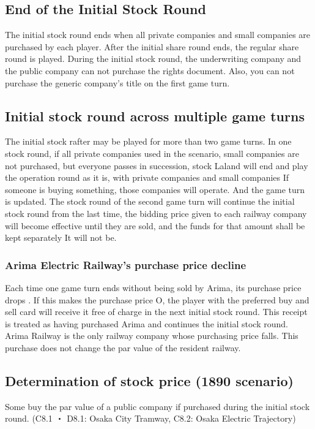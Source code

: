 \documentclass{article}
\begin{document}
\begin{CJK}{UTF8}{min}
\subsection{End of the Initial Stock Round}
The initial stock round ends when all private companies and small
companies are purchased by each player. After the initial share round
ends, the regular share round is played. During the initial stock
round, the underwriting company and the public company can not
purchase the rights document. Also, you can not purchase the generic
company's title on the first game turn.

\subsection{Initial stock round across multiple game turns}
The initial stock rafter may be played for more than two game
turns. In one stock round, if all private companies used in the
scenario, small companies are not purchased, but everyone passes in
succession, stock Laland will end and play the operation round as it
is, with private companies and small companies If someone is buying
something, those companies will operate. And the game turn is
updated. The stock round of the second game turn will continue the
initial stock round from the last time, the bidding price given to
each railway company will become effective until they are sold, and
the funds for that amount shall be kept separately It will not be.

\subsubsection{Arima Electric Railway's purchase price decline}
Each time one game turn ends without being sold by Arima, its purchase
price drops . If this makes the purchase price \yen O, the
player with the preferred buy and sell card will receive it free of
charge in the next initial stock round. This receipt is treated as
having purchased Arima and continues the initial stock round. Arima
Railway is the only railway company whose purchasing price falls. This
purchase does not change the par value of the resident railway.

\subsection{Determination of stock price (1890 scenario)}
Some buy the par value of a public company if purchased during the initial stock round. (C8.1 ・ D8.1: Osaka City Tramway, C8.2: Osaka Electric Trajectory)



\end{CJK}
\end{document}
